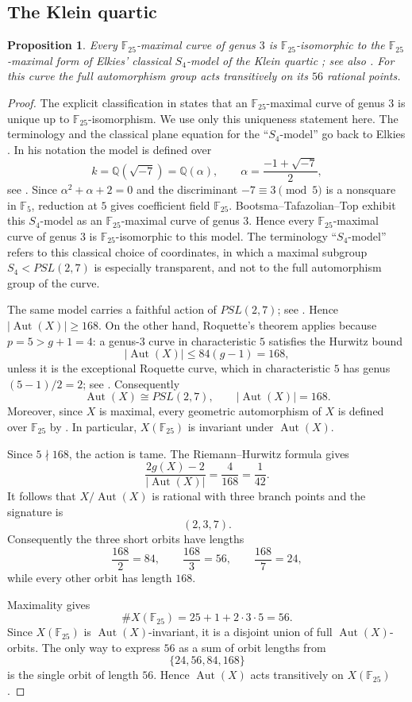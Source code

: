 \documentclass[11pt]{amsart}
\newtheorem{proposition}[theorem]{Proposition}
\theoremstyle{remark}
\newcommand{\F}{\mathbb F}
\newcommand{\Aut}{\operatorname{Aut}}
\begin{document}
\subsection{The Klein quartic}

\begin{proposition}\label{prop:klein}
Every $\F_{25}$-maximal curve of genus $3$ is $\F_{25}$-isomorphic to
the $\F_{25}$-maximal form of Elkies' classical $S_4$-model of the
Klein quartic \cite[(1.11)]{ElkiesKlein}; see also
\cite[\S3.1]{BTT}. For this curve the full automorphism group acts
transitively on its $56$ rational points.
\end{proposition}

\begin{proof}
The explicit classification in \cite[Lemma~3.1(3)]{BMT} states that
an $\F_{25}$-maximal curve of genus $3$ is unique up to
$\F_{25}$-isomorphism. We use only this uniqueness statement here.
The terminology and the classical plane equation for the
``$S_4$-model'' go back to Elkies \cite[(1.11)]{ElkiesKlein}.  In his
notation the model is defined over
\[
        k=\mathbb{Q}(\sqrt{-7})=\mathbb{Q}(\alpha),
        \qquad
        \alpha=\frac{-1+\sqrt{-7}}2,
\]
see \cite[\S1.3]{ElkiesKlein}.  Since
$\alpha^2+\alpha+2=0$ and the discriminant $-7\equiv3\pmod 5$ is a
nonsquare in $\F_5$, reduction at $5$ gives coefficient field
$\F_{25}$.  Bootsma--Tafazolian--Top \cite[\S3.1]{BTT} exhibit this
$S_4$-model as an $\F_{25}$-maximal curve of genus $3$. Hence every
$\F_{25}$-maximal curve of genus $3$ is $\F_{25}$-isomorphic to this
model. The terminology ``$S_4$-model'' refers to this classical choice
of coordinates, in which a maximal subgroup $S_4<PSL(2,7)$ is especially
transparent, and not to the full automorphism group of the curve.

The same model carries a faithful action of $PSL(2,7)$; see
\cite[\S3.1]{BTT}. Hence $|\Aut(X)|\ge168$. On the other hand,
Roquette's theorem applies because $p=5>g+1=4$: a genus-$3$ curve in
characteristic $5$ satisfies the Hurwitz bound
\[
        |\Aut(X)|\le84(g-1)=168,
\]
unless it is the exceptional Roquette curve, which in characteristic
$5$ has genus $(5-1)/2=2$; see \cite{Roquette}. Consequently
\[
\Aut(X)\cong PSL(2,7),
\qquad
|\Aut(X)|=168.
\]
Moreover, since $X$ is maximal, every geometric
automorphism of $X$ is defined over $\F_{25}$ by
\cite[Theorem~3.10]{GSY}. In particular,
$X(\F_{25})$ is invariant under $\Aut(X)$.

Since $5\nmid168$, the action is tame. The Riemann--Hurwitz formula
gives
\[
\frac{2g(X)-2}{|\Aut(X)|}
=
\frac{4}{168}
=
\frac1{42}.
\]
It follows that $X/\Aut(X)$ is rational with three branch points and
the signature is
\[
(2,3,7).
\]
Consequently the three short orbits have lengths
\[
\frac{168}{2}=84,
\qquad
\frac{168}{3}=56,
\qquad
\frac{168}{7}=24,
\]
while every other orbit has length $168$.

Maximality gives
\[
\#X(\F_{25})
=
25+1+2\cdot3\cdot5
=
56.
\]
Since $X(\F_{25})$ is $\Aut(X)$-invariant, it is a disjoint union of
full $\Aut(X)$-orbits. The only way to express $56$ as a sum of orbit
lengths from
\[
\{24,56,84,168\}
\]
is the single orbit of length $56$. Hence $\Aut(X)$ acts transitively
on $X(\F_{25})$.
\end{proof}
\end{document}
